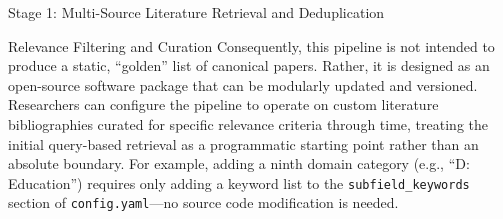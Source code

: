 \documentclass[
  ignorenonframetext,
]{beamer}
\begin{document}
\begin{frame}[fragile]{Stage 1: Multi-Source Literature Retrieval and
Deduplication \label{sec:methods_retrieval}}
\begin{block}{Relevance Filtering and Curation}
Consequently, this pipeline is not intended to produce a static,
``golden'' list of canonical papers. Rather, it is designed as an
open-source software package that can be modularly updated and
versioned. Researchers can configure the pipeline to operate on custom
literature bibliographies curated for specific relevance criteria
through time, treating the initial query-based retrieval as a
programmatic starting point rather than an absolute boundary. For
example, adding a ninth domain category (e.g., ``D: Education'')
requires only adding a keyword list to the \texttt{subfield\_keywords}
section of \texttt{config.yaml}---no source code modification is needed.
\end{block}
\end{frame}
\end{document}
